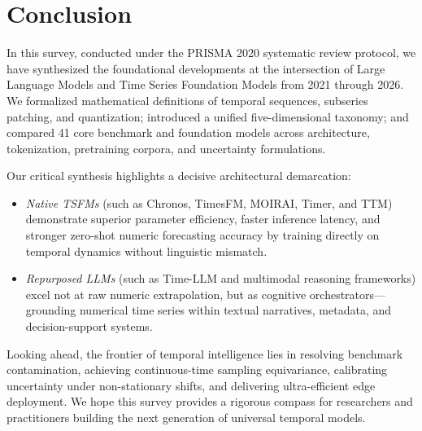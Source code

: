 \section{Conclusion}
\label{sec:conclusion}

In this survey, conducted under the PRISMA 2020 systematic review protocol, we have synthesized the foundational developments at the intersection of Large Language Models and Time Series Foundation Models from 2021 through 2026. We formalized mathematical definitions of temporal sequences, subseries patching, and quantization; introduced a unified five-dimensional taxonomy; and compared 41 core benchmark and foundation models across architecture, tokenization, pretraining corpora, and uncertainty formulations.

Our critical synthesis highlights a decisive architectural demarcation:
\begin{itemize}[leftmargin=*]
    \item \emph{Native TSFMs} (such as Chronos, TimesFM, MOIRAI, Timer, and TTM) demonstrate superior parameter efficiency, faster inference latency, and stronger zero-shot numeric forecasting accuracy by training directly on temporal dynamics without linguistic mismatch.
    \item \emph{Repurposed LLMs} (such as Time-LLM and multimodal reasoning frameworks) excel not at raw numeric extrapolation, but as cognitive orchestrators—grounding numerical time series within textual narratives, metadata, and decision-support systems.
\end{itemize}

Looking ahead, the frontier of temporal intelligence lies in resolving benchmark contamination, achieving continuous-time sampling equivariance, calibrating uncertainty under non-stationary shifts, and delivering ultra-efficient edge deployment. We hope this survey provides a rigorous compass for researchers and practitioners building the next generation of universal temporal models.
